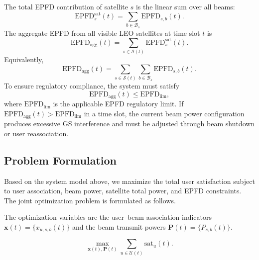 The total EPFD contribution of satellite $s$ is the linear sum over all beams:
\begin{equation*}
\mathrm{EPFD}_{s}^{\mathrm{sat}}(t)=\sum_{b\in\mathcal{B}_s} \mathrm{EPFD}_{s,b}(t).
\end{equation*}
The aggregate EPFD from all visible LEO satellites at time slot $t$ is
\begin{equation*}
\mathrm{EPFD}_{\mathrm{agg}}(t)=\sum_{s\in\mathcal{S}(t)} \mathrm{EPFD}_{s}^{\mathrm{sat}}(t).
\end{equation*}
Equivalently,
\begin{equation*}
\mathrm{EPFD}_{\mathrm{agg}}(t)=\sum_{s\in\mathcal{S}(t)}\sum_{b\in\mathcal{B}_s} \mathrm{EPFD}_{s,b}(t).
\end{equation*}
To ensure regulatory compliance, the system must satisfy
\begin{equation}
\mathrm{EPFD}_{\mathrm{agg}}(t)\le \mathrm{EPFD}_{\mathrm{lim}},
\label{eq:ch3_epfd_limit}
\end{equation}
where $\mathrm{EPFD}_{\mathrm{lim}}$ is the applicable EPFD regulatory limit. If $\mathrm{EPFD}_{\mathrm{agg}}(t)>\mathrm{EPFD}_{\mathrm{lim}}$ in a time slot, the current beam power configuration produces excessive GS interference and must be adjusted through beam shutdown or user reassociation.

\subsection{Problem Formulation}
\label{sec:problem_formulation}

Based on the system model above, we maximize the total user satisfaction subject to user association, beam power, satellite total power, and EPFD constraints. The joint optimization problem is formulated as follows.

The optimization variables are the user--beam association indicators $\mathbf{x}(t)=\{x_{u,s,b}(t)\}$ and the beam transmit powers $\mathbf{P}(t)=\{P_{s,b}(t)\}$.

\begin{equation}
\max_{\mathbf{x}(t),\mathbf{P}(t)}
\sum_{u\in\mathcal{U}(t)} \mathrm{sat}_u(t).
\label{eq:ch3_prob_obj}
\end{equation}

